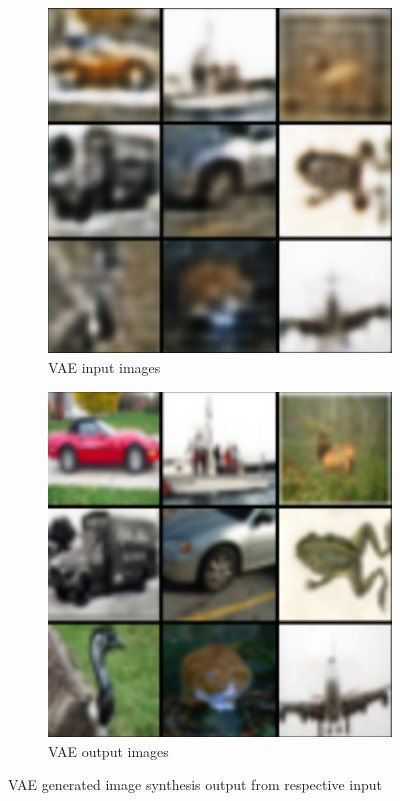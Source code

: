 \documentclass[%
 reprint,
 amsmath,amssymb,
 aps,
]{revtex4-2}
\begin{document}
\begin{figure}[h]
    \begin{subfigure}{\columnwidth}
        \centering
        \includegraphics[width=.8\linewidth]{vaein.png}
        \caption{VAE input images}
        \label{fig:vaein}
    \end{subfigure}
    \hfill
    \begin{subfigure}{\columnwidth}
        \centering
        \includegraphics[width=.8\linewidth]{vaeout.png}
        \caption{VAE output images}
        \label{fig:vaeout}
    \end{subfigure}
    \caption{VAE generated image synthesis output from respective input}
    \label{fig:vaeresults}
\end{figure}
\end{document}
